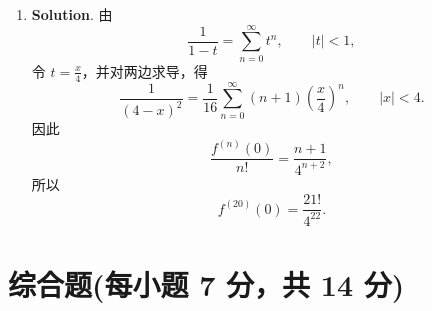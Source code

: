 \documentclass[../main.tex]{subfiles}
\begin{document}
\begin{enumerate}
    \item \textbf{Solution}. 由
          \[
              \frac{1}{1-t}=\sum_{n=0}^{\infty}t^n,\qquad |t|<1,
          \]
          令 \(t=\frac{x}{4}\)，并对两边求导，得
          \[
              \frac1{(4-x)^2}=\frac1{16}\sum_{n=0}^{\infty}(n+1)\left(\frac{x}{4}\right)^n,\qquad |x|<4.
          \]
          因此
          \[
              \frac{f^{(n)}(0)}{n!}=\frac{n+1}{4^{n+2}},
          \]
          所以
          \[
              f^{(20)}(0)=\frac{21!}{4^{22}}.
          \]

\end{enumerate}

\section{综合题(每小题 7 分，共 14 分)}
\end{document}
